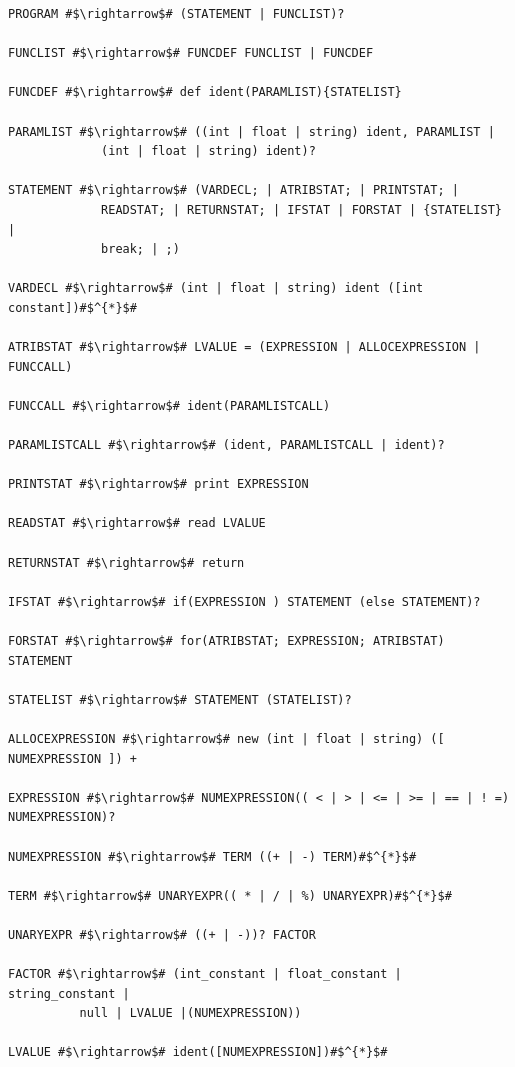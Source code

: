 \documentclass[
	12pt,				%
	openright,			%
	twoside,			%
	a4paper,			%
	english,			%
	french,				%
	spanish,			%
	brazil				%
	]{abntex2}
\begin{document}
\begin{lstlisting}[escapechar=\#]
PROGRAM #$\rightarrow$# (STATEMENT | FUNCLIST)?

FUNCLIST #$\rightarrow$# FUNCDEF FUNCLIST | FUNCDEF  

FUNCDEF #$\rightarrow$# def ident(PARAMLIST){STATELIST}  

PARAMLIST #$\rightarrow$# ((int | float | string) ident, PARAMLIST |
             (int | float | string) ident)?  

STATEMENT #$\rightarrow$# (VARDECL; | ATRIBSTAT; | PRINTSTAT; |
             READSTAT; | RETURNSTAT; | IFSTAT | FORSTAT | {STATELIST} |
             break; | ;) 

VARDECL #$\rightarrow$# (int | float | string) ident ([int constant])#$^{*}$#

ATRIBSTAT #$\rightarrow$# LVALUE = (EXPRESSION | ALLOCEXPRESSION | FUNCCALL)

FUNCCALL #$\rightarrow$# ident(PARAMLISTCALL)  

PARAMLISTCALL #$\rightarrow$# (ident, PARAMLISTCALL | ident)?  

PRINTSTAT #$\rightarrow$# print EXPRESSION  

READSTAT #$\rightarrow$# read LVALUE  

RETURNSTAT #$\rightarrow$# return  

IFSTAT #$\rightarrow$# if(EXPRESSION ) STATEMENT (else STATEMENT)?  

FORSTAT #$\rightarrow$# for(ATRIBSTAT; EXPRESSION; ATRIBSTAT) STATEMENT  

STATELIST #$\rightarrow$# STATEMENT (STATELIST)?  

ALLOCEXPRESSION #$\rightarrow$# new (int | float | string) ([ NUMEXPRESSION ]) + 

EXPRESSION #$\rightarrow$# NUMEXPRESSION(( < | > | <= | >= | == | ! =) NUMEXPRESSION)? 

NUMEXPRESSION #$\rightarrow$# TERM ((+ | -) TERM)#$^{*}$#  

TERM #$\rightarrow$# UNARYEXPR(( * | / | %) UNARYEXPR)#$^{*}$#

UNARYEXPR #$\rightarrow$# ((+ | -))? FACTOR  

FACTOR #$\rightarrow$# (int_constant | float_constant | string_constant |
          null | LVALUE |(NUMEXPRESSION))  

LVALUE #$\rightarrow$# ident([NUMEXPRESSION])#$^{*}$# 
\end{lstlisting}
\end{document}
